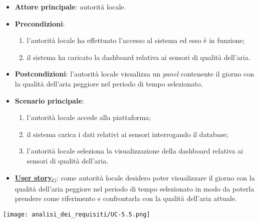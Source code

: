 \begin{itemize}
	\item \textbf{Attore principale}: autorità locale.
	\item \textbf{Precondizioni}:
	      \begin{enumerate}
		      \item l'autorità locale ha effettuato l'accesso al sistema ed esso è in funzione;
		      \item il sistema ha caricato la dashboard relativa ai sensori di qualità dell'aria.
	      \end{enumerate}
	\item \textbf{Postcondizioni}: l'autorità locale visualizza un \textit{panel} contenente il giorno con la qualità dell'aria peggiore nel periodo di tempo selezionato.
	\item \textbf{Scenario principale}:
	      \begin{enumerate}
		      \item l'autorità locale accede alla piattaforma;
		      \item il sistema carica i dati relativi ai sensori interrogando il database;
		      \item l'autorità locale seleziona la visualizzazione della dashboard relativa ai sensori di qualità dell'aria.
	      \end{enumerate}
	\item \href{https://7last.github.io/docs/rtb/documentazione-interna/glossario\#user-story}{\textbf{User story}\textsubscript{G}}:
	      come autorità locale desidero poter visualizzare il giorno con la qualità dell'aria peggiore nel periodo di tempo selezionato
	      in modo da poterla prendere come riferimento e confrontarla con la qualità dell'aria attuale.
\end{itemize}
\begin{center}
	\texttt{[image: analisi\_dei\_requisiti/UC-5.5.png]}
\end{center}


